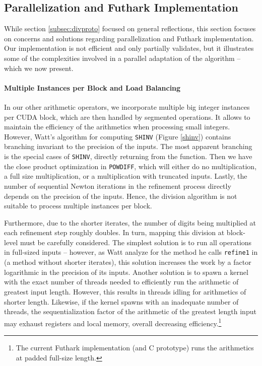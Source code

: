\subsection{Parallelization and Futhark Implementation}
\label{subsec:divfut}

While section \ref{subsec:divproto} focused on general reflections, this section
focuses on concerns and solutions regarding parallelization and Futhark
implementation. Our implementation is not efficient and only partially
validates, but it illustrates some of the complexities involved in a parallel
adaptation of the algorithm -- which we now present.

\paragraph{Multiple Instances per Block and Load Balancing}
In our other arithmetic operators, we incorporate multiple big integer instances
per CUDA block, which are then handled by segmented operations. It allows to
maintain the efficiency of the arithmetics when processing small
integers. However, Watt's algorithm for computing \texttt{SHINV} (Figure
\ref{shinv}) contains branching invariant to the precision of the inputs. The
most apparent branching is the special cases of \texttt{SHINV}, directly
returning from the function. Then we have the close product optimization in
\texttt{POWDIFF}, which will either do no multiplication, a full size
multiplication, or a multiplication with truncated inputs. Lastly, the number of
sequential Newton iterations in the refinement process directly depends on the
precision of the inputs.  Hence, the division algorithm is not suitable to
process multiple instances per block.

Furthermore, due to the shorter iterates, the number of digits being multiplied
at each refinement step roughly doubles. In turn, mapping this division at
block-level must be carefully considered. The simplest solution is to run all
operations in full-sized inputs -- however, as Watt analyze for the method he
calls \texttt{refine1} in \cite{watt2023efficient} (a method without shorter
iterates), this solution increases the work by a factor logarithmic in the
precision of its inputs. Another solution is to spawn a kernel with the exact
number of threads needed to efficiently run the arithmetic of greatest input
length. However, this results in threads idling for arithmetics of shorter
length. Likewise, if the kernel spawns with an inadequate number of threads, the
sequentialization factor of the arithmetic of the greatest length input may
exhaust registers and local memory, overall decreasing efficiency.\footnote{The
  current Futhark implementation (and C prototype) runs the arithmetics at
  padded full-size length.}

